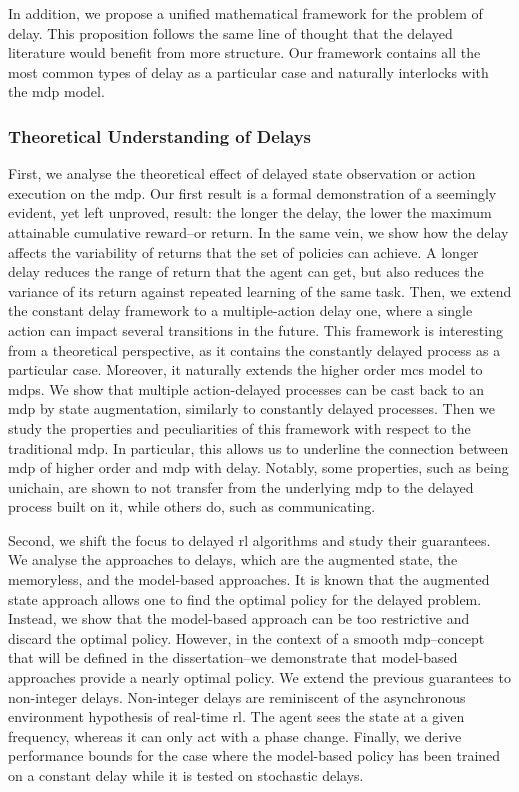 In addition, we propose a unified mathematical framework for the problem of delay.
This proposition follows the same line of thought that the delayed literature would benefit from more structure.
Our framework contains all the most common types of delay as a particular case and naturally interlocks with the \gls{mdp} model.

\subsubsection{Theoretical Understanding of Delays}
First, we analyse the theoretical effect of delayed state observation or action execution on the \gls{mdp}.
Our first result is a formal demonstration of a seemingly evident, yet left unproved, result: the longer the delay, the lower the maximum attainable cumulative reward--or return.
In the same vein, we show how the delay affects the variability of returns that the set of policies can achieve. 
A longer delay reduces the range of return that the agent can get, but also reduces the variance of its return against repeated learning of the same task. 
Then, we extend the constant delay framework to a multiple-action delay one, where a single action can impact several transitions in the future. 
This framework is interesting from a theoretical perspective, as it contains the constantly delayed process as a particular case. 
Moreover, it naturally extends the higher order \glspl{mc} model to \glspl{mdp}.
We show that multiple action-delayed processes can be cast back to an \gls{mdp} by state augmentation, similarly to constantly delayed processes. 
Then we study the properties and peculiarities of this framework with respect to the traditional \gls{mdp}. 
In particular, this allows us to underline the connection between \gls{mdp} of higher order and \gls{mdp} with delay.
Notably, some properties, such as being unichain, are shown to not transfer from the underlying \gls{mdp} to the delayed process built on it, while others do, such as communicating. 

Second, we shift the focus to delayed \gls{rl} algorithms and study their guarantees. 
We analyse the approaches to delays, which are the augmented state, the memoryless, and the model-based approaches.
It is known that the augmented state approach allows one to find the optimal policy for the delayed problem. 
Instead, we show that the model-based approach can be too restrictive and discard the optimal policy.
However, in the context of a smooth \gls{mdp}--concept that will be defined in the dissertation--we demonstrate that model-based approaches provide a nearly optimal policy.
We extend the previous guarantees to non-integer delays. 
Non-integer delays are reminiscent of the asynchronous environment hypothesis of real-time \gls{rl}. 
The agent sees the state at a given frequency, whereas it can only act with a phase change. 
Finally, we derive performance bounds for the case where the model-based policy has been trained on a constant delay while it is tested on stochastic delays.


